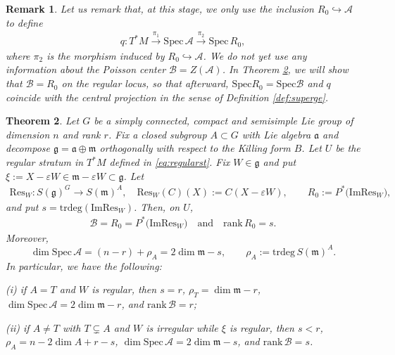 \documentclass[11pt]{amsart}
\newtheorem{theorem}{Theorem}[section]
\theoremstyle{definition}
\theoremstyle{plain}
\newtheorem{remark}[theorem]{Remark}
\theoremstyle{conclusion}
\begin{document}
\begin{remark}
Let us remark that, at this stage, we only use the inclusion $R_0\hookrightarrow\mathcal{A}$ to define \begin{align*}
   q:T^*M \xrightarrow{\ \pi_1\ } \mathrm{Spec}\,\mathcal{A}
\xrightarrow{\ \pi_2\ } \mathrm{Spec}\, R_0, 
\end{align*}  where $\pi_2$ is the morphism induced by $R_0\hookrightarrow\mathcal{A}$. We do not yet use any information about the Poisson center $\mathcal{B}=Z(\mathcal{A})$. In Theorem \ref{thm:dimea}, we will show that $\mathcal{B}=R_0$ on the regular locus, so that afterward, $\mathrm{Spec} R_0 = \mathrm{Spec}\mathcal{B}$ and $q$ coincide with the central projection in the sense of Definition \ref{def:superge}.
\end{remark}
 

 \begin{theorem}
 \label{thm:dimea}
        Let $G$ be a simply connected, compact and semisimple Lie group of dimension $n$ and rank $r$. Fix a closed subgroup $A\subset G$ with Lie algebra $\mathfrak{a}$ and decompose $\mathfrak{g}=\mathfrak{a}\oplus\mathfrak{m}$ orthogonally with respect to the Killing form $B$. Let $U$ be the regular stratum in $T^*M$ defined in \eqref{eq:regularst}. Fix $W \in \mathfrak{g}$ and put $\xi:=X-\varepsilon W\in\mathfrak{m} -\varepsilon W\subset\mathfrak{g}$.  Let \begin{align*}
    \mathrm{Res}_W: S(\mathfrak{g})^G\to S(\mathfrak{m})^A,\quad \mathrm{Res}_W(C)(X):=C(X-\varepsilon W), \qquad R_0:=P^*\big(\mathrm{Im}\mathrm{Res}_W\big),
\end{align*} and put $s =\mathrm{trdeg}(\mathrm{Im}\mathrm{Res}_W)$. Then, on $U$, \begin{align*} 
\mathcal{B} =R_0=P^*\big(\mathrm{Im}\mathrm{Res}_W\big)\quad\text{and}\quad \mathrm{rank}\, R_0=s.
\end{align*}  Moreover, $$\dim\mathrm{Spec} \,\mathcal{A}=(n-r)+\rho_{A}=2\dim\mathfrak{m}-s,\qquad \rho_{A}:=\mathrm{trdeg} \, S(\mathfrak{m})^A. $$ In particular, we have the following:

(i) if $A=T$ and $W$ is regular, then $s=r$, $\rho_{T}=\dim\mathfrak{m}-r$, $\dim\mathrm{Spec} \,\mathcal{A}=2\dim\mathfrak{m}-r$, and $\mathrm{rank}\, \mathcal{B}=r$;

(ii) if $A\neq T$ with $T\subsetneq A$ and $W$ is irregular while $\xi$ is regular, then $s< r$, $\rho_{A}=n-2\dim A+r-s$, $\dim\mathrm{Spec} \,\mathcal{A}=2\dim\mathfrak{m}-s$, and $\mathrm{rank}\, \mathcal{B}=s$.    
 \end{theorem}
\end{document}
